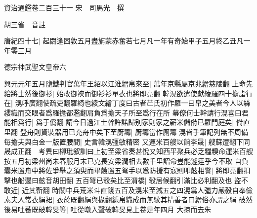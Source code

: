 資治通鑑卷二百三十一
宋　司馬光　撰

胡三省　音註

唐紀四十七|{
	起閼逢困敦五月盡旃蒙赤奮若七月凡一年有奇始甲子五月終乙丑凡一年零三月}


德宗神武聖文皇帝六

興元元年五月鹽鐵判官萬年王紹以江淮繒帛來至|{
	萬年京縣屬京兆繒慈陵翻}
上命先給將士然後御衫|{
	始改御裌而御衫衫單衣也將即亮翻}
韓滉欲遣使獻綾羅四十擔詣行在|{
	滉呼廣翻使疏吏翻羅綺也綾文繒丁度曰古者芒氏初作羅一曰帛之美者今人以絲縷織而交眼者爲羅擔都濫翻肩負爲擔天子所至爲行在所}
幕僚何士幹請行滉喜曰君能相爲行|{
	爲于僞翻}
請今日過江士幹許諾歸别家則家之薪米儲偫已羅門庭矣|{
	偫直里翻}
登舟則資裝器用已充舟中矣下至厨籌|{
	厨籌當作厠籌}
滉皆手筆記列無不周備每擔夫與白金一版置腰間|{
	史言韓滉彊敏精密}
又運米百艘以餉李晟|{
	艘蘇遭翻下同晟成正翻　考異曰柳玭叙訓曰上初至梁省奏甚悅又知西平聚兵必乏糧糗命運米百艘按五月初梁州尚未春服月末已克長安梁潤相去數千里詔命豈能遽逹乎今不取}
自負囊米置舟中將佐爭舉之須臾而畢艘置五弩手以爲防援有寇則叩舷相警|{
	將即亮翻扣擊也船邊曰舷音胡田翻}
五百弩已彀矣比至渭橋|{
	彀居候翻引滿比必利翻及也}
盗不敢近|{
	近其靳翻}
時關中兵荒米斗直錢五百及滉米至減五之四滉爲人彊力嚴毅自奉儉素夫人常衣絹裙|{
	衣於既翻絹與掾翻縑帛織成而無紋其精善者曰繒俗亦謂之絹}
破然後易吐蕃既破韓旻等|{
	吐從暾入聲破韓旻見上卷是年四月}
大掠而去朱

